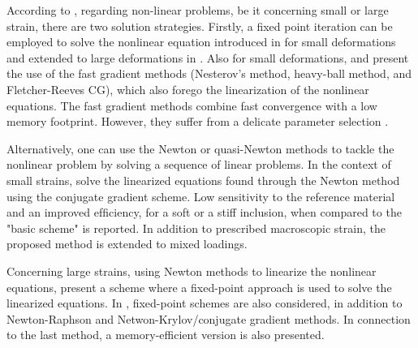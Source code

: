 According to \cite{kabel_efficient_2014}, regarding non-linear problems, be it concerning small or large strain, there are two solution strategies.
Firstly, a fixed point iteration can be employed to solve the nonlinear equation introduced in \cite{moulinec_numerical_1998} for small deformations and extended to large deformations in \cite{eisenlohr_spectral_2013}.
Also for small deformations, \cite{schneider_fft-based_2017} and \cite{schneider_dynamical_2020} present the use of the fast gradient methods (Nesterov's method, heavy-ball method, and Fletcher-Reeves CG), which also forego the linearization of the nonlinear equations.
The fast gradient methods combine fast convergence with a low memory footprint.
However, they suffer from a delicate parameter selection \citep{schneider_dynamical_2020}.

Alternatively, one can use the Newton or quasi-Newton methods to tackle the nonlinear problem by solving a sequence of linear problems.
In the context of small strains, \cite{gelebart_non-linear_2013} solve the linearized equations found through the Newton method using the conjugate gradient scheme.
Low sensitivity to the reference material and an improved efﬁciency, for a soft or a stiff inclusion, when compared to the "basic scheme" is reported.
In addition to prescribed macroscopic strain, the proposed method is extended to mixed loadings.

Concerning large strains, using Newton methods to linearize the nonlinear equations, \cite{lahellec_analysis_2003} present a scheme where a fixed-point approach is used to solve the linearized equations.
In \cite{kabel_efficient_2014}, fixed-point schemes are also considered, in addition to Newton-Raphson and Netwon-Krylov/conjugate gradient methods.
In connection to the last method, a memory-efficient version is also presented.


